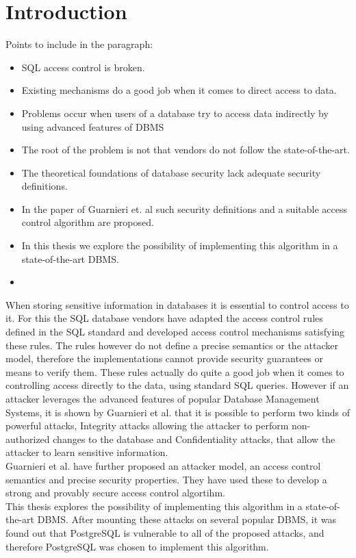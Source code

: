 \section{Introduction}

Points to include in the paragraph:

\begin{itemize}
	\item SQL access control is broken.
	\item Existing mechanisms do a good job when it comes to direct access to data.
	\item Problems occur when users of a database try to access data indirectly by using advanced features of DBMS 
	\item The root of the problem is not that vendors do not follow the state-of-the-art.
	\item The theoretical foundations of database security lack adequate security definitions.
	\item In the paper of Guarnieri et. al such security definitions and a suitable access control algorithm are proposed. 
	\item In this thesis we explore the possibility of implementing this algorithm in a state-of-the-art DBMS.
	\item 
\end{itemize}

When storing sensitive information in databases it is essential to control access to it. For this the SQL database vendors have adapted the access control rules defined in the SQL standard and developed access control mechanisms satisfying these rules. The rules however do not define a precise semantics or the attacker model, therefore the implementations cannot provide security guarantees or means to verify them.
These rules actually do quite a good job when it comes to controlling access directly to the data, using standard SQL queries. However if an attacker leverages the advanced features of popular Database Management Systems, it is shown by Guarnieri et al. that it is possible to perform two kinds of powerful attacks, Integrity attacks allowing the attacker to perform non-authorized changes to the database and Confidentiality attacks, that allow the attacker to learn sensitive information.\\
Guarnieri et al. have further proposed an attacker model, an access control semantics and precise security properties. They have used these to develop a strong and provably secure access control algortihm.\\
This thesis explores the possibility of implementing this algorithm in a state-of-the-art DBMS. After mounting these attacks on several popular DBMS, it was found out that PostgreSQL is vulnerable to all of the proposed attacks, and therefore PostgreSQL was chosen to implement this algorithm.

